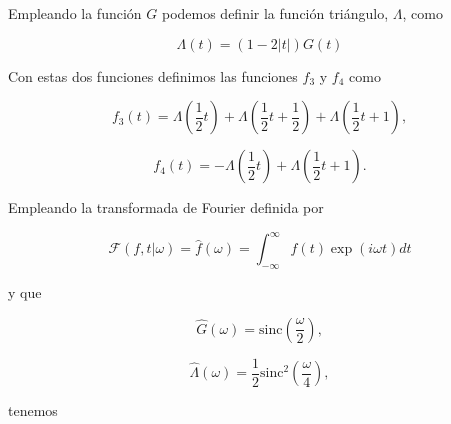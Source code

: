 \documentclass[a4paper,12pt,final]{article}
\begin{document}
      \noindent Empleando la función $G$ podemos definir la función triángulo,
      $\Lambda$, como

      \begin{equation*}
         \Lambda\left(t\right) = \left(1 - 2\left|t\right|\right)G\left(t\right)
      \end{equation*}

      \noindent Con estas dos funciones definimos las funciones $f_3$ y $f_4$
      como

      \begin{equation*}
         f_3\left(t\right) = \Lambda\left(\frac{1}{2}t\right) +
                             \Lambda\left(\frac{1}{2}t + \frac{1}{2}\right) +
                             \Lambda\left(\frac{1}{2}t + 1\right),
      \end{equation*}

      \begin{equation*}
         f_4\left(t\right) = - \Lambda\left(\frac{1}{2}t\right) +
                               \Lambda\left(\frac{1}{2}t + 1\right).
      \end{equation*}

      \noindent Empleando la transformada de Fourier definida por

      \begin{equation*}
        \mathcal{F}\left(f,t|\omega\right) = \widehat{f}\left(\omega\right) = \int_{-\infty}^{\infty}f\left(t\right)\exp\left(i \omega t\right)dt
      \end{equation*}

      \noindent y que

      \begin{equation*}
        \widehat{G}\left(\omega\right) = \mathrm{sinc}\left(\frac{\omega}{2}\right),
      \end{equation*}

      \begin{equation*}
        \widehat{\Lambda}\left(\omega\right) = \frac{1}{2}\mathrm{sinc}^{2}\left(\frac{\omega}{4}\right),
      \end{equation*}

      \noindent tenemos
\end{document}
